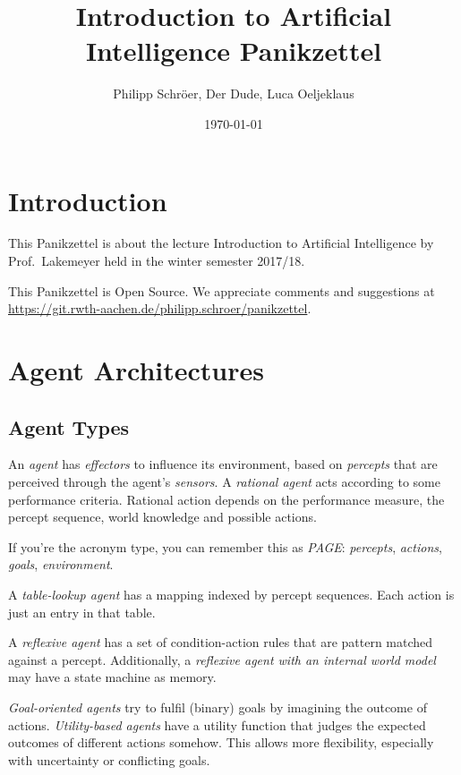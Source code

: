 \documentclass[english]{panikzettel}
\title{Introduction to Artificial Intelligence Panikzettel}
\author{Philipp Schröer, Der Dude, Luca Oeljeklaus}
\date{\today}
\begin{document}
\maketitle

\tableofcontents

\section{Introduction}

This Panikzettel is about the lecture Introduction to Artificial Intelligence by Prof.\ Lakemeyer held in the winter semester 2017/18.

This Panikzettel is Open Source. We appreciate comments and suggestions at \\ \url{https://git.rwth-aachen.de/philipp.schroer/panikzettel}.

\section{Agent Architectures}

\subsection{Agent Types}

An \emph{agent} has \emph{effectors} to influence its environment, based on \emph{percepts} that are perceived  through the agent's \emph{sensors}.
A \emph{rational agent} acts according to some performance criteria.
Rational action depends on the performance measure, the percept sequence, world knowledge and possible actions.

If you're the acronym type, you can remember this as \emph{PAGE}: \emph{percepts}, \emph{actions}, \emph{goals}, \emph{environment}.

A \emph{table-lookup agent} has a mapping indexed by percept sequences.
Each action is just an entry in that table.

A \emph{reflexive agent} has a set of condition-action rules that are pattern matched against a percept.
Additionally, a \emph{reflexive agent with an internal world model} may have a state machine as memory.

\emph{Goal-oriented agents} try to fulfil (binary) goals by imagining the outcome of actions.
\emph{Utility-based agents} have a utility function that judges the expected outcomes of different actions somehow.
This allows more flexibility, especially with uncertainty or conflicting goals.
\end{document}
